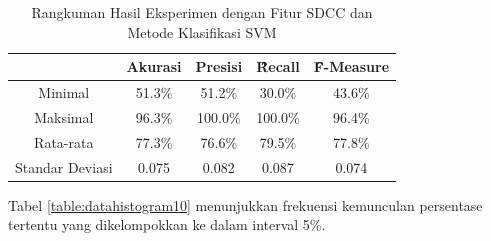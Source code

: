   \begin{table}
    \centering
    \caption{Rangkuman Hasil Eksperimen dengan Fitur SDCC dan Metode Klasifikasi SVM}
    \begin{tabular}{|c|c|c|c|c|}
      \hline
       & Akurasi & Presisi & \f{\f{Recall}} & \f{\f{F-Measure}} \\ \hline
      Minimal         & 51.3\% & 51.2\%  & 30.0\%  & 43.6\% \\ \hline
      Maksimal        & 96.3\% & 100.0\% & 100.0\% & 96.4\% \\ \hline
      Rata-rata       & 77.3\% & 76.6\%  & 79.5\%  & 77.8\% \\ \hline
      Standar Deviasi & 0.075  & 0.082   & 0.087   & 0.074  \\ \hline
    \end{tabular}
    \label{table:sdccsvm}
  \end{table}

  Tabel \ref{table:datahistogram10} menunjukkan frekuensi kemunculan persentase tertentu yang dikelompokkan ke dalam interval 5\%.

